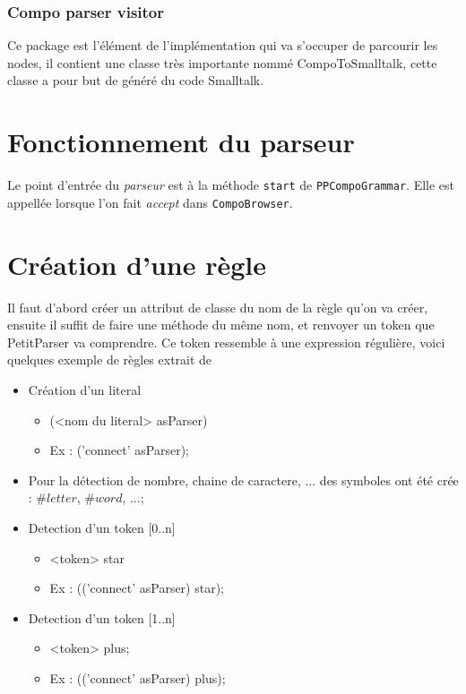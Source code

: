 \documentclass[11pt,a4paper,openany,oneside]{book}
\begin{document}
\begin{appendices}
\subsubsection{Compo parser visitor}
Ce package est l'élément de l'implémentation qui va s'occuper de parcourir les nodes, il contient une classe très importante nommé
CompoToSmalltalk, cette classe a pour but de généré du code Smalltalk.

\section*{Fonctionnement du parseur}
Le point d'entrée du \textit{parseur} est à la méthode \texttt{start} de \texttt{PPCompoGrammar}. Elle est appellée lorsque l'on fait \textit{accept} dans \texttt{CompoBrowser}.

\section*{Création d'une règle}
Il faut d'abord créer un attribut de classe du nom de la règle qu'on va créer, ensuite il suffit de faire une méthode du même nom, 
et renvoyer un token que PetitParser va comprendre. Ce token ressemble à une expression régulière, voici quelques exemple de règles extrait de \citep{rulesParseur}
\begin{itemize}
\item  Création d'un literal
    \begin{itemize}
    \item (<nom du literal> asParser) 
    \item Ex :  ('connect' asParser);
    \end{itemize}
\item  Pour la détection de nombre, chaine de caractere, ... des symboles ont été crée : $\#letter$, $\#word$, ...;

\item Detection d'un token [0..n]
    \begin{itemize}
    \item <token> star
    \item Ex : (('connect' asParser) star); 
    \end{itemize}

\item Detection d'un token [1..n]
    \begin{itemize}
    \item <token> plus;
    \item  Ex : (('connect' asParser) plus); 
    \end{itemize}


\end{itemize}
\end{appendices}
\end{document}
